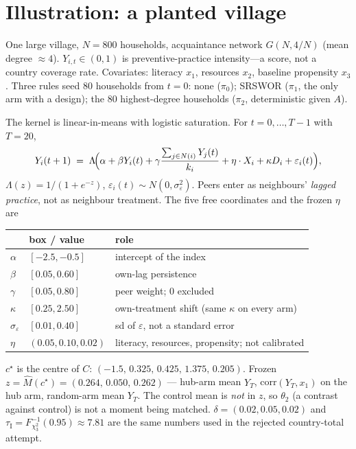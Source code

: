 \documentclass[11pt]{article}
\newcommand{\thr}{\tau_{\mathrm{I}}}
\begin{document}
\section{Illustration: a planted village}

One large village, $N=800$ households, acquaintance network
$G(N,4/N)$ (mean degree $\approx 4$). $Y_{i,t}\in(0,1)$ is
preventive-practice intensity---a score, not a country coverage rate.
Covariates: literacy $x_1$, resources $x_2$, baseline propensity $x_3$.
Three rules seed 80 households from $t=0$: none ($\pi_0$); SRSWOR
($\pi_1$, the only arm with a design); the 80 highest-degree
households ($\pi_2$, deterministic given $A$).

The kernel is linear-in-means with logistic saturation. For
$t=0,\ldots,T-1$ with $T=20$,
\begin{equation}
  Y_i(t+1)
  \;=\;
  \Lambda\!\Bigl(
    \alpha + \beta Y_i(t)
    + \gamma \frac{\sum_{j\in N(i)} Y_j(t)}{k_i}
    + \eta\cdot X_i
    + \kappa D_i
    + \varepsilon_i(t)
  \Bigr),
\end{equation}
$\Lambda(z)=1/(1+e^{-z})$, $\varepsilon_i(t)\sim N(0,\sigma_\varepsilon^2)$.
Peers enter as neighbours' \emph{lagged practice}, not as neighbour
treatment. The five free coordinates and the frozen $\eta$ are
\begin{center}
\small
\begin{tabular}{@{}llp{72mm}@{}}
\toprule
 & box / value & role \\
\midrule
$\alpha$ & $[-2.5,-0.5]$ & intercept of the index \\
$\beta$ & $[0.05,0.60]$ & own-lag persistence \\
$\gamma$ & $[0.05,0.80]$ & peer weight; $0$ excluded \\
$\kappa$ & $[0.25,2.50]$ & own-treatment shift (same $\kappa$ on every arm) \\
$\sigma_\varepsilon$ & $[0.01,0.40]$ & sd of $\varepsilon$, not a standard error \\
$\eta$ & $(0.05,0.10,0.02)$ & literacy, resources, propensity; not calibrated \\
\bottomrule
\end{tabular}
\end{center}

$c^\star$ is the centre of $C$:
$(-1.5,\,0.325,\,0.425,\,1.375,\,0.205)$.
Frozen $z=\widehat M(c^\star)=(0.264,\,0.050,\,0.262)$ --- hub-arm
mean $Y_T$, corr$(Y_T,x_1)$ on the hub arm, random-arm mean $Y_T$.
The control mean is \emph{not} in $z$, so $\theta_2$ (a contrast
against control) is not a moment being matched.
$\delta=(0.02,0.05,0.02)$ and
$\thr=F^{-1}_{\chi^2_3}(0.95)\approx 7.81$ are the same numbers used in
the rejected country-total attempt.
\end{document}
